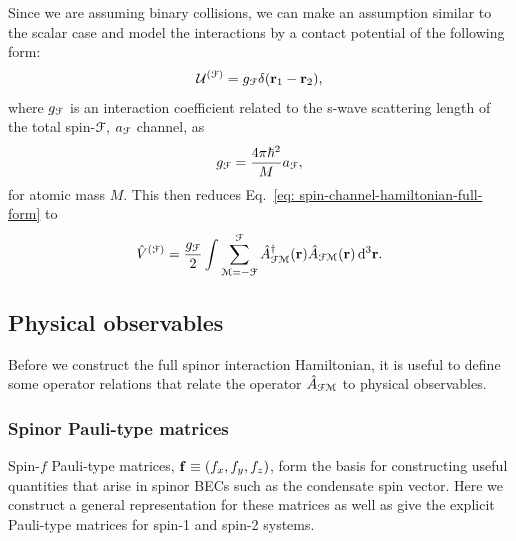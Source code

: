 Since we are assuming binary collisions, we can make an assumption similar to
the scalar case and model the interactions by a contact potential of the
following form:
\begin{align}
    \mathcal{U}^{(\EuScript{F})} = g_\EuScript{F}\delta(\vb{r}_1-\vb{r}_2),
\end{align}
where \(g_\EuScript{F}\) is an interaction coefficient related to the s-wave
scattering length of the total spin-\(\EuScript{F}\), \(a_\EuScript{F}\)
channel, as
\begin{align}
    g_\EuScript{F} = \frac{4\pi\hbar^2}{M}a_\EuScript{F},
\end{align}
for atomic mass \(M\).
This then reduces Eq.~\eqref{eq: spin-channel-hamiltonian-full-form} to
\begin{align}\label{eq: spin-channel-hamiltonian}
    \hat{V}^{(\EuScript{F})} = \frac{g_\EuScript{F}}{2}\int
    \sum_{\EuScript{M}=-\EuScript{F}}^{\EuScript{F}}
    \hat{A}^\dagger_{\EuScript{F}\EuScript{M}}(\vb{r})
    \hat{A}_{\EuScript{F}\EuScript{M}}(\vb{r}) \,
    \dd^3\vb{r}.
\end{align}

\subsection{Physical observables}
Before we construct the full spinor interaction Hamiltonian, it is useful to
define some operator relations that relate the operator
\(\hat{A}_{\EuScript{F}\EuScript{M}}\) to physical observables.

\subsubsection{Spinor Pauli-type matrices}
Spin-\(f\) Pauli-type matrices, \(\vb{f}\equiv(f_x, f_y, f_z)\), form the
basis for constructing useful quantities that arise in spinor BECs such as the
condensate spin vector.
Here we construct a general representation for these matrices as well as give
the explicit Pauli-type matrices for spin-1 and spin-2 systems.

